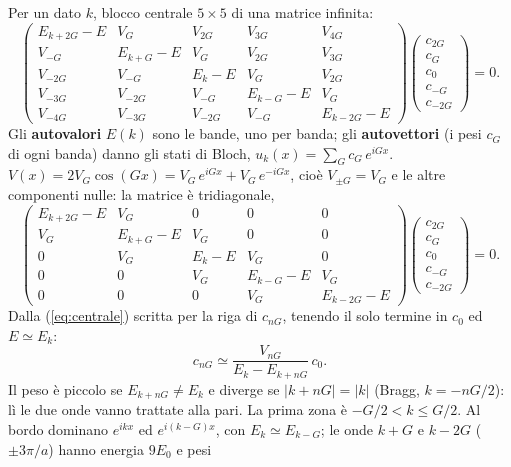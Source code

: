 \documentclass[11pt,a4paper]{article}
\begin{document}
\begin{dimostrazione}[dall'equazione centrale a $E_\pm=E_0\pm|V_G|$]
Per un dato $k$, blocco centrale $5\times5$ di una matrice infinita:
\[
\begin{pmatrix}
E_{k+2G}-E&V_G&V_{2G}&V_{3G}&V_{4G}\\
V_{-G}&E_{k+G}-E&V_G&V_{2G}&V_{3G}\\
V_{-2G}&V_{-G}&E_k-E&V_G&V_{2G}\\
V_{-3G}&V_{-2G}&V_{-G}&E_{k-G}-E&V_G\\
V_{-4G}&V_{-3G}&V_{-2G}&V_{-G}&E_{k-2G}-E
\end{pmatrix}
\begin{pmatrix}c_{2G}\\c_G\\c_0\\c_{-G}\\c_{-2G}\end{pmatrix}=0 .
\]
Gli \textbf{autovalori} $E(k)$ sono le bande, uno per banda; gli \textbf{autovettori} (i pesi $c_G$ di ogni banda) danno gli stati di Bloch, $u_k(x)=\sum_Gc_G\,e^{iGx}$.
$V(x)=2V_G\cos(Gx)=V_G\,e^{iGx}+V_G\,e^{-iGx}$, cioè $V_{\pm G}=V_G$ e le altre componenti nulle: la matrice è tridiagonale,
\[
\begin{pmatrix}
E_{k+2G}-E&V_G&0&0&0\\
V_G&E_{k+G}-E&V_G&0&0\\
0&V_G&E_k-E&V_G&0\\
0&0&V_G&E_{k-G}-E&V_G\\
0&0&0&V_G&E_{k-2G}-E
\end{pmatrix}
\begin{pmatrix}c_{2G}\\c_G\\c_0\\c_{-G}\\c_{-2G}\end{pmatrix}=0 .
\]
Dalla (\ref{eq:centrale}) scritta per la riga di $c_{nG}$, tenendo il solo termine in $c_0$ ed $E\simeq E_k$:
\[
c_{nG}\simeq\frac{V_{nG}}{E_k-E_{k+nG}}\,c_0 .
\]
Il peso è piccolo se $E_{k+nG}\ne E_k$ e diverge se $|k+nG|=|k|$ (Bragg, $k=-nG/2$): lì le due onde vanno trattate alla pari.
La prima zona è $-G/2<k\le G/2$. Al bordo dominano $e^{ikx}$ ed $e^{i(k-G)x}$, con $E_k\simeq E_{k-G}$; le onde $k+G$ e $k-2G$ ($\pm3\pi/a$) hanno energia $9E_0$ e pesi

\end{dimostrazione}
\end{document}
